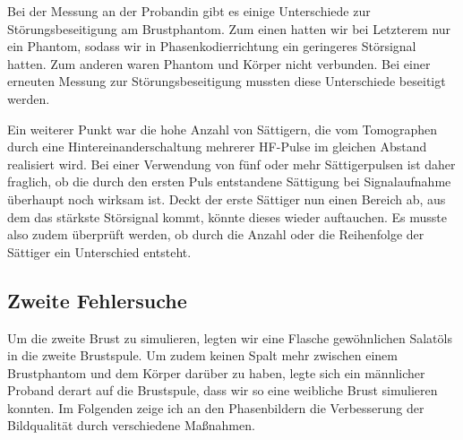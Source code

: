 \documentclass[
    11pt,
    ngerman
]{scrbook}
\begin{document}
Bei der Messung an der Probandin gibt es einige Unterschiede zur
Störungsbeseitigung am Brustphantom. Zum einen hatten wir bei Letzterem nur
ein Phantom, sodass wir in Phasenkodierrichtung ein geringeres Störsignal
hatten. Zum anderen waren Phantom und Körper nicht verbunden.  Bei einer
erneuten Messung zur Störungsbeseitigung mussten diese Unterschiede beseitigt
werden. 

Ein weiterer Punkt war die hohe Anzahl von Sättigern, die vom Tomographen
durch eine Hintereinanderschaltung mehrerer HF-Pulse im gleichen Abstand
realisiert wird. Bei einer Verwendung von fünf oder mehr Sättigerpulsen ist
daher fraglich, ob die durch den ersten Puls entstandene Sättigung bei
Signalaufnahme überhaupt noch wirksam ist. Deckt der erste Sättiger nun einen
Bereich ab, aus dem das stärkste Störsignal kommt, könnte dieses wieder
auftauchen. Es musste also zudem überprüft werden, ob durch die Anzahl oder
die Reihenfolge der Sättiger ein Unterschied entsteht.

\subsection{Zweite Fehlersuche}

Um die zweite Brust zu simulieren, legten wir eine Flasche gewöhnlichen
Salatöls in die zweite Brustspule. Um zudem keinen Spalt mehr zwischen
einem Brustphantom und dem Körper darüber zu haben, legte sich ein
männlicher Proband derart auf die Brustspule, dass wir so eine weibliche
Brust simulieren konnten. Im Folgenden zeige ich an den Phasenbildern die
Verbesserung der Bildqualität durch verschiedene Maßnahmen.
\end{document}
